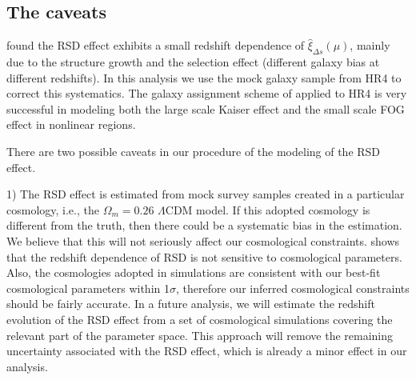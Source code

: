 \documentclass[iop]{emulateapj}
\begin{document}


\subsection{The caveats}\label{sec:caveats}

\cite{Li2014,Li2015} found the RSD effect exhibits a small redshift dependence of $\hat \xi_{\Delta s}(\mu)$, 
mainly due to the structure growth and the selection effect
(different galaxy bias at different redshifts).
In this analysis we use the mock galaxy sample from HR4 to correct this systematics.
The galaxy assignment scheme of \cite{hong2016} applied to HR4 is very successful in modeling both the 
large scale Kaiser effect and the small scale FOG effect in nonlinear regions.

There are two possible caveats in our procedure of the modeling of the RSD effect.

1) The RSD effect is estimated from mock survey samples created in a particular cosmology, 
i.e., the $\Omega_m=0.26$ $\Lambda$CDM model. %
If this adopted cosmology is different from the truth, then there could be a systematic bias in the estimation. %
We believe that this will not seriously affect our cosmological constraints.
\cite{Li2014} shows that the redshift dependence of RSD is not sensitive to cosmological parameters.
Also, the cosmologies adopted in simulations are consistent with our best-fit cosmological parameters within 1$\sigma$,
therefore our inferred cosmological constraints should be fairly accurate.
In a future analysis,
we will estimate the redshift evolution of the RSD effect from a set of cosmological simulations 
covering the relevant part of the parameter space.
This approach will remove the remaining uncertainty associated with the RSD effect, 
which is already a minor effect in our analysis.
\end{document}
